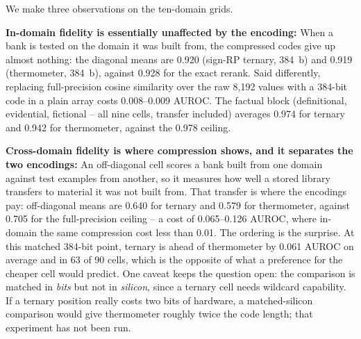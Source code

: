 \documentclass[conference]{IEEEtran}
\newcommand{\auroc}{{AUROC}\xspace}
\newcommand{\signrp}{{sign-RP}\xspace}
\begin{document}
We make three observations on the ten-domain grids.

\textbf{In-domain fidelity is essentially unaffected by the encoding:}
When a bank is tested on the domain it was built from, the compressed
codes give up almost nothing: the diagonal means are 0.920 (\signrp
ternary, 384~b) and 0.919 (thermometer, 384~b), against 0.928 for the
exact rerank. Said differently, replacing full-precision cosine
similarity over the raw 8{,}192 values with a 384-bit code in a plain
array costs 0.008--0.009 \auroc. The factual block (definitional,
evidential, fictional -- all nine cells, transfer included) averages
0.974 for ternary and 0.942 for thermometer, against the 0.978
ceiling.

\textbf{Cross-domain fidelity is where compression shows, and it
separates the two encodings:} An off-diagonal cell scores a bank
built from one domain against test examples from another, so it
measures how well a stored library transfers to material it was not
built from. That transfer is where the encodings pay: off-diagonal
means are 0.640 for ternary and 0.579 for thermometer, against 0.705
for the full-precision ceiling -- a cost of 0.065--0.126 \auroc,
where in-domain the same compression cost less than 0.01. The
ordering is the surprise. At this matched 384-bit point, ternary is
ahead of thermometer by 0.061 \auroc on average and in 63 of 90
cells, which is the opposite of what a preference for the cheaper
cell would predict. One caveat keeps the question open: the
comparison is matched in \emph{bits} but not in \emph{silicon},
since a ternary cell needs wildcard capability. If a ternary position
really costs two bits of hardware, a matched-silicon comparison would
give thermometer roughly twice the code length; that experiment has
not been run.
\end{document}
